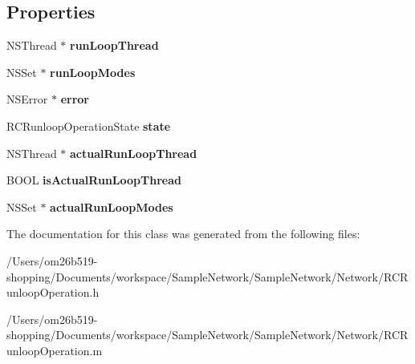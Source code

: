 \subsection*{Properties}
\begin{DoxyCompactItemize}
\item 
\hypertarget{interface_r_c_runloop_operation_a163bfc68cb50acb0c44d5af646869093}{N\-S\-Thread $\ast$ {\bfseries run\-Loop\-Thread}}\label{interface_r_c_runloop_operation_a163bfc68cb50acb0c44d5af646869093}

\item 
\hypertarget{interface_r_c_runloop_operation_a0f94911d3902530f311c569c7508c5cc}{N\-S\-Set $\ast$ {\bfseries run\-Loop\-Modes}}\label{interface_r_c_runloop_operation_a0f94911d3902530f311c569c7508c5cc}

\item 
\hypertarget{interface_r_c_runloop_operation_a724b8a159e7bc9a947a666ac8dd3b6ef}{N\-S\-Error $\ast$ {\bfseries error}}\label{interface_r_c_runloop_operation_a724b8a159e7bc9a947a666ac8dd3b6ef}

\item 
\hypertarget{interface_r_c_runloop_operation_adcef5dc81931b2ded954ea25e44c3a06}{R\-C\-Runloop\-Operation\-State {\bfseries state}}\label{interface_r_c_runloop_operation_adcef5dc81931b2ded954ea25e44c3a06}

\item 
\hypertarget{interface_r_c_runloop_operation_a7486f0c2e9e264ce7797b6fd90f31917}{N\-S\-Thread $\ast$ {\bfseries actual\-Run\-Loop\-Thread}}\label{interface_r_c_runloop_operation_a7486f0c2e9e264ce7797b6fd90f31917}

\item 
\hypertarget{interface_r_c_runloop_operation_a850632f1ee70e33a447b32f6b413119b}{B\-O\-O\-L {\bfseries is\-Actual\-Run\-Loop\-Thread}}\label{interface_r_c_runloop_operation_a850632f1ee70e33a447b32f6b413119b}

\item 
\hypertarget{interface_r_c_runloop_operation_ac5365b29f5040ccb3b058f48de681c50}{N\-S\-Set $\ast$ {\bfseries actual\-Run\-Loop\-Modes}}\label{interface_r_c_runloop_operation_ac5365b29f5040ccb3b058f48de681c50}

\end{DoxyCompactItemize}


The documentation for this class was generated from the following files\-:\begin{DoxyCompactItemize}
\item 
/\-Users/om26b519-\/shopping/\-Documents/workspace/\-Sample\-Network/\-Sample\-Network/\-Network/R\-C\-Runloop\-Operation.\-h\item 
/\-Users/om26b519-\/shopping/\-Documents/workspace/\-Sample\-Network/\-Sample\-Network/\-Network/R\-C\-Runloop\-Operation.\-m\end{DoxyCompactItemize}
